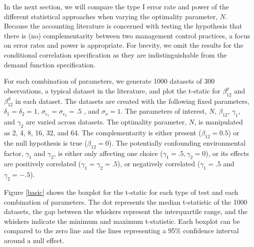 \documentclass[12pt]{article}
\begin{document}
In the next section, we will compare the type I error rate and power of
the different statistical approaches when varying the optimality
parameter, \(N\). Because the accounting literature is concerned with
testing the hypothesis that there is (no) complementarity between two
management control practices, a focus on error rates and power is
appropriate. For brevity, we omit the results for the conditional
correlation specification as they are indistinguishable from the demand
function specification.

For each combination of parameters, we generate 1000 datasets of 300
observations, a typical dataset in the literature, and plot the t-static
for \(\beta^p_{12}\) and \(\beta^d_{12}\) in each dataset. The datasets
are created with the following fixed parameters,
\(\delta_1 = \delta_2 = 1\),
\(\sigma_{\epsilon_1} = \sigma_{\epsilon_2} = .5\) , and
\(\sigma_{\nu} = 1\). The parameters of interest, \(N\), \(\beta_{12}\),
\(\gamma_1\), and \(\gamma_2\) are varied across datasets. The
optimality parameter, \(N\), is manipulated as 2, 4, 8, 16, 32, and 64.
The complementarity is either present (\(\beta_{12} = 0.5\)) or the null
hypothesis is true (\(\beta_{12} = 0\)). The potentially confounding
environmental factor, \(\gamma_1\) and \(\gamma_2\), is either only
affecting one choice (\(\gamma_1 = .5, \gamma_2 = 0\)), or its effects
are positively correlated (\(\gamma_1 = \gamma_2 = .5\)), or negatively
correlated (\(\gamma_1 = .5\) and \(\gamma_2 = -.5\)).

Figure \ref{basic} shows the boxplot for the t-static for each type of
test and each combination of parameters. The dot represents the median
t-statistic of the 1000 datasets, the gap between the whiskers represent
the interquartile range, and the whiskers indicate the minimum and
maximum t-statistic. Each boxplot can be compared to the zero line and
the lines representing a 95\% confidence interval around a null effect.
\end{document}

